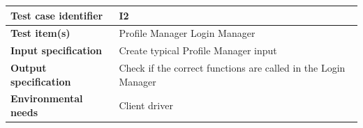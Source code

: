 \documentclass[a4paper,11pt]{report} %
\begin{document}
		\begin{center}
			\renewcommand{\arraystretch}{1.2}
			\setlength{\tabcolsep}{24pt}
			\begin{tabular}{ l  p{9cm}}\hline
				\textbf{Test case identifier} & I2\\\hline
				\textbf{Test item(s)} & Profile Manager \textrightarrow Login Manager\\\hline
				\textbf{Input specification} & Create typical Profile Manager input \\\hline
				\textbf{Output specification} & Check if the correct functions are called in the Login Manager\\\hline
				\textbf{Environmental needs} & Client driver\\\hline
			\end{tabular}
		\end{center}
				
\end{document}
